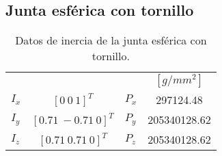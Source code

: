 \subsection{Junta esférica con tornillo}
\begin{table}[hb!]
 \begin{center}
\begin{tabular}{lclc}


% 

 & & & $[g/mm^2]$\\
 $ I_x $ & $ [0 \ 0 \ 1]^T $ & $ P_x $ & 297124.48\\
 $ I_y $ & $ [0.71 \ -0.71 \ 0]^T $ & $ P_y $ & 205340128.62\\
 $ I_z $ & $ [0.71 \ 0.71 \ 0]^T $ & $ P_z $ & 205340128.62
\end{tabular}
\end{center}
\caption{Datos de inercia de la junta esférica con tornillo.}
\label{tab: inertia table joint}
\end{table}
